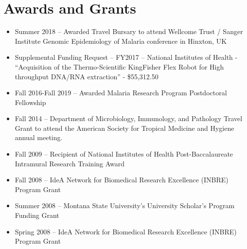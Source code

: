 \documentclass[11pt, a4paper]{awesome-cv}
\providecommand{\tightlist}{%
	\setlength{\itemsep}{0pt}\setlength{\parskip}{0pt}}
\begin{document}
\hypertarget{awards-and-grants}{%
\section{Awards and Grants}\label{awards-and-grants}}

\begin{itemize}
\tightlist
\item
  Summer 2018 -- Awarded Travel Bursary to attend Wellcome Trust /
  Sanger Institute Genomic Epidemiology of Malaria conference in
  Hinxton, UK
\item
  Supplemental Funding Request -- FY2017 -- National Institutes of
  Health - ``Acquisition of the Thermo-Scientific KingFisher Flex Robot
  for High throughput DNA/RNA extraction'' - \$55,312.50
\item
  Fall 2016-Fall 2019 -- Awarded Malaria Research Program Postdoctoral
  Fellowship
\item
  Fall 2014 -- Department of Microbiology, Immunology, and Pathology
  Travel Grant to attend the American Society for Tropical Medicine and
  Hygiene annual meeting.
\item
  Fall 2009 -- Recipient of National Institutes of Health
  Post-Baccalaureate Intramural Research Training Award
\item
  Fall 2008 -- IdeA Network for Biomedical Research Excellence (INBRE)
  Program Grant
\item
  Summer 2008 -- Montana State University's University Scholar's Program
  Funding Grant
\item
  Spring 2008 -- IdeA Network for Biomedical Research Excellence (INBRE)
  Program Grant
\end{itemize}
\end{document}

